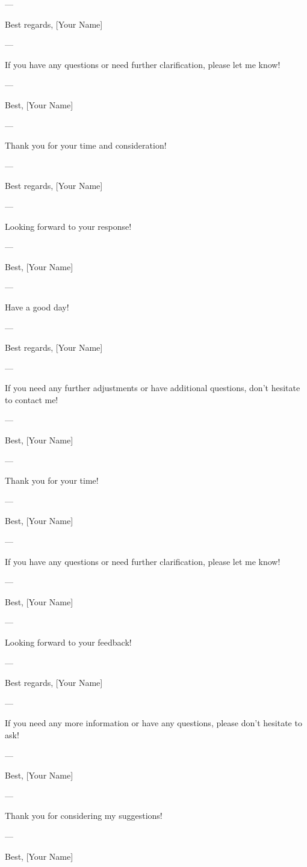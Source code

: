 --- 

Best regards,  
[Your Name]  

--- 

If you have any questions or need further clarification, please let me know! 

--- 

Best,  
[Your Name]  

--- 

Thank you for your time and consideration! 

--- 

Best regards,  
[Your Name]  

--- 

Looking forward to your response! 

--- 

Best,  
[Your Name]  

--- 

Have a good day! 

--- 

Best regards,  
[Your Name]  

--- 

If you need any further adjustments or have additional questions, don't hesitate to contact me! 

--- 

Best,  
[Your Name]  

--- 

Thank you for your time! 

--- 

Best,  
[Your Name]  

--- 

If you have any questions or need further clarification, please let me know! 

--- 

Best,  
[Your Name]  

--- 

Looking forward to your feedback! 

--- 

Best regards,  
[Your Name]  

--- 

If you need any more information or have any questions, please don't hesitate to ask! 

--- 

Best,  
[Your Name]  

--- 

Thank you for considering my suggestions! 

--- 

Best,  
[Your Name]  


